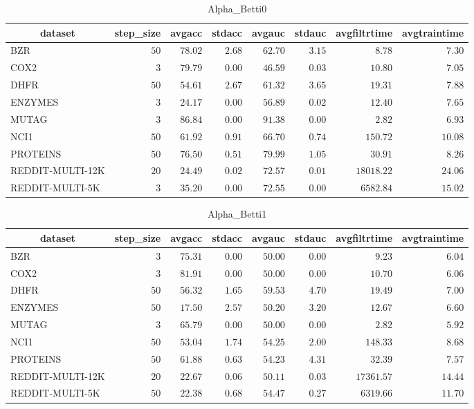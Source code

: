 \begin{table}[!tbp]
\caption{Alpha_Betti0\label{Alpha_Betti0}} 
{\centering
\begin{tabular}{lrrrrrrr}
\hline\hline
\multicolumn{1}{c}{dataset}&\multicolumn{1}{c}{step_size}&\multicolumn{1}{c}{avgacc}&\multicolumn{1}{c}{stdacc}&\multicolumn{1}{c}{avgauc}&\multicolumn{1}{c}{stdauc}&\multicolumn{1}{c}{avgfiltrtime}&\multicolumn{1}{c}{avgtraintime}\tabularnewline
\hline
BZR&$50$&$78.02$&$2.68$&$62.70$&$3.15$&$    8.78$&$ 7.30$\tabularnewline
COX2&$ 3$&$79.79$&$0.00$&$46.59$&$0.03$&$   10.80$&$ 7.05$\tabularnewline
DHFR&$50$&$54.61$&$2.67$&$61.32$&$3.65$&$   19.31$&$ 7.88$\tabularnewline
ENZYMES&$ 3$&$24.17$&$0.00$&$56.89$&$0.02$&$   12.40$&$ 7.65$\tabularnewline
MUTAG&$ 3$&$86.84$&$0.00$&$91.38$&$0.00$&$    2.82$&$ 6.93$\tabularnewline
NCI1&$50$&$61.92$&$0.91$&$66.70$&$0.74$&$  150.72$&$10.08$\tabularnewline
PROTEINS&$50$&$76.50$&$0.51$&$79.99$&$1.05$&$   30.91$&$ 8.26$\tabularnewline
REDDIT-MULTI-12K&$20$&$24.49$&$0.02$&$72.57$&$0.01$&$18018.22$&$24.06$\tabularnewline
REDDIT-MULTI-5K&$ 3$&$35.20$&$0.00$&$72.55$&$0.00$&$ 6582.84$&$15.02$\tabularnewline
\hline
\end{tabular}}
\end{table}
\begin{table}[!tbp]
\caption{Alpha_Betti1\label{Alpha_Betti1}} 
{\centering
\begin{tabular}{lrrrrrrr}
\hline\hline
\multicolumn{1}{c}{dataset}&\multicolumn{1}{c}{step_size}&\multicolumn{1}{c}{avgacc}&\multicolumn{1}{c}{stdacc}&\multicolumn{1}{c}{avgauc}&\multicolumn{1}{c}{stdauc}&\multicolumn{1}{c}{avgfiltrtime}&\multicolumn{1}{c}{avgtraintime}\tabularnewline
\hline
BZR&$ 3$&$75.31$&$0.00$&$50.00$&$0.00$&$    9.23$&$ 6.04$\tabularnewline
COX2&$ 3$&$81.91$&$0.00$&$50.00$&$0.00$&$   10.70$&$ 6.06$\tabularnewline
DHFR&$50$&$56.32$&$1.65$&$59.53$&$4.70$&$   19.49$&$ 7.00$\tabularnewline
ENZYMES&$50$&$17.50$&$2.57$&$50.20$&$3.20$&$   12.67$&$ 6.60$\tabularnewline
MUTAG&$ 3$&$65.79$&$0.00$&$50.00$&$0.00$&$    2.82$&$ 5.92$\tabularnewline
NCI1&$50$&$53.04$&$1.74$&$54.25$&$2.00$&$  148.33$&$ 8.68$\tabularnewline
PROTEINS&$50$&$61.88$&$0.63$&$54.23$&$4.31$&$   32.39$&$ 7.57$\tabularnewline
REDDIT-MULTI-12K&$20$&$22.67$&$0.06$&$50.11$&$0.03$&$17361.57$&$14.44$\tabularnewline
REDDIT-MULTI-5K&$50$&$22.38$&$0.68$&$54.47$&$0.27$&$ 6319.66$&$11.70$\tabularnewline
\hline
\end{tabular}}
\end{table}
